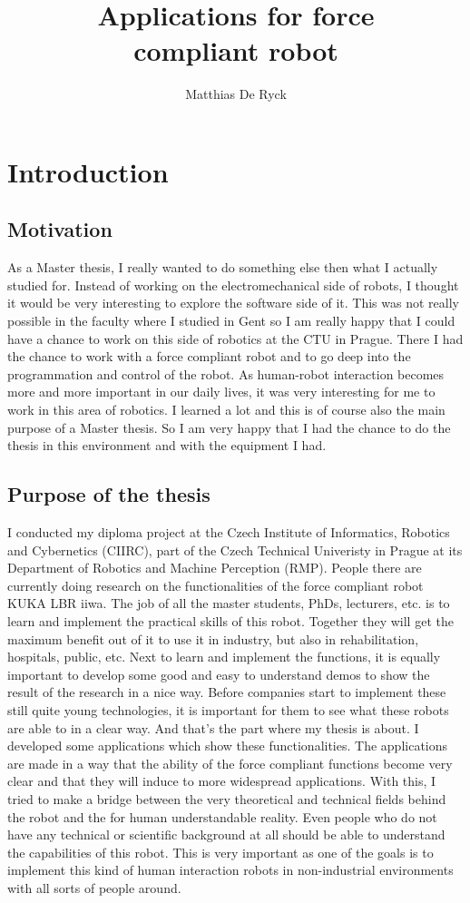 \documentclass[11pt,a4paper]{report}
\title{Applications for force\\ compliant robot}
\subtitle{ }
\author{Matthias De Ryck}
\begin{document}
\preface

\chapter{Introduction}
\section{Motivation}
As a Master thesis, I really wanted to do something else then what I actually studied for. Instead of working on the electromechanical side of robots, I thought it would be very interesting to explore the software side of it. This was not really possible in the faculty where I studied in Gent so I am really happy that I could have a chance to work on this side of robotics at the CTU in Prague. There I had the chance to work with a force compliant robot and to go deep into the programmation and control of the robot. As human-robot interaction becomes more and more important in our daily lives, it was very interesting for me to work in this area of robotics. I learned a lot and this is of course also the main purpose of a Master thesis. So I am very happy that I had the chance to do the thesis in this environment and with the equipment I had.
\section{Purpose of the thesis}
I conducted my diploma project at the Czech Institute of Informatics, Robotics and Cybernetics (CIIRC), part of the Czech Technical Univeristy in Prague at its Department of Robotics and Machine Perception (RMP). People there are currently doing research on the functionalities of the force compliant robot KUKA LBR iiwa. The job of all the master students, PhDs, lecturers, etc. is to learn and implement the practical skills of this robot. Together they will get the maximum benefit out of it to use it in industry, but also in rehabilitation, hospitals, public, etc. Next to learn and implement the functions, it is equally important to develop some good and easy to understand demos to show the result of the research in a nice way. Before companies start to implement these still quite young technologies, it is important for them to see what these robots are able to in a clear way. And that's the part where my thesis is about. I developed some applications which show these functionalities. The applications are made in a way that the ability of the force compliant functions become very clear and that they will induce to more widespread applications.
With this, I tried to make a bridge between the very theoretical and technical fields behind the robot and the for human understandable reality. Even people who do not have any technical or scientific background at all should be able to understand the capabilities of this robot. This is very important as one of the goals is to implement this kind of human interaction robots in non-industrial environments with all sorts of people around.
\end{document}
